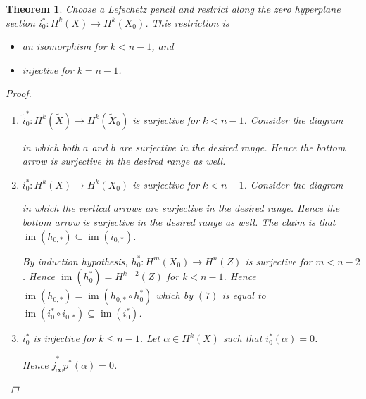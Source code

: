 \documentclass[A4paper, british]{amsart}
\theoremstyle{darkgreentheorem}
\newtheorem{thm}{Theorem}[section]
\theoremstyle{darkbluedefinition}
\theoremstyle{darkredexample}
\theoremstyle{remark}
\DeclareMathOperator{\im}{im}
\newcommand{\1}{\mathbbm{1}}
\newcommand{\op}{\oplus}
\newcommand{\sub}{\subseteq}
\begin{document}
\begin{thm}
    Choose a Lefschetz pencil and restrict along the zero hyperplane section $i_{0}^{*}\colon H^{k}(X)\to H^{k}(X_{0})$.
    This restriction is
    \begin{itemize}
	\item an isomorphism for $k<n-1$, and
	\item injective for $k=n-1$.
    \end{itemize}
    \begin{proof}
	\begin{enumerate}
	    \item $\tilde{i}_{0}^{*}\colon H^{k}(\tilde{X})\to H^{k}(\tilde{X}_{0})$ is surjective for $k<n-1$.
		Consider the diagram
		\begin{center}
		\end{center}
		in which both $a$ and $b$ are surjective in the desired range.
		Hence the bottom arrow is surjective in the desired range as well.
	    \item $i_{0}^{*}\colon H^{k}(X)\to H^{k}(X_{0})$ is surjective for $k<n-1$.
		Consider the diagram
		\begin{center}
		\end{center}
		in which the vertical arrows are surjective in the desired range.
		Hence the bottom arrow is surjective in the desired range as well.
		The claim is that $\im(h_{0,*})\sub \im(i_{0,*})$.

		By induction hypothesis, $h_{0}^{*}\colon H^{m}(X_{0})\to H^{n}(Z)$ is surjective for $m<n-2$.
		Hence $\im(h_{0}^{*})=H^{k-2}(Z)$ for $k<n-1$.
		Hence $\im(h_{0,*})=\im(h_{0,*}\circ h_{0}^{*})$ which by $(7)$ is equal to $\im(i_{0}^{*}\circ i_{0,*})\sub \im(i_{0}^{*})$.
	    \item $i_{0}^{*}$ is injective for $k\leqslant n-1$.
		Let $\alpha\in H^{k}(X)$ such that $i_{0}^{*}(\alpha)=0$.
		\begin{center}
		\end{center}
		Hence $\tilde{j}_{\infty}^{*}p^{*}(\alpha)=0$.


\end{enumerate}
\end{proof}
\end{thm}
\end{document}
